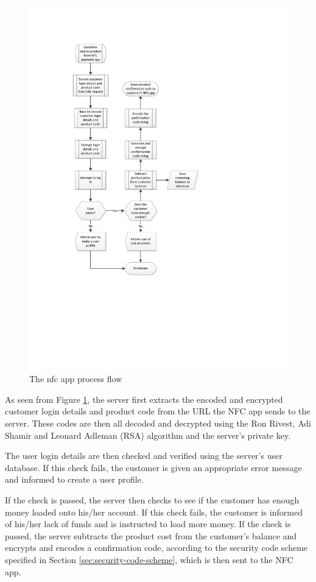 \begin{figure}
 \centering 
 \includegraphics[clip=true, trim = 0 200 100 80,
 scale=0.7]{nfc_processflow_bak}
 \caption{The nfc app process flow}
 \label{fig:nfc-process}
\end{figure}

As seen from Figure \ref{fig:nfc-process}, the server first extracts the encoded and encrypted
customer login details and product code from the URL the NFC app sends to the server. These
codes are then all decoded and decrypted using the Ron Rivest, Adi Shamir and Leonard Adleman
(RSA) algorithm and the server's private key. 

The user login details are then checked and verified using the server's user database. If this
check fails, the customer is given an appropriate error message and informed to create a user
profile. 

If the check is passed, the server then checks to see if the customer has enough money loaded
onto his/her account. If this check fails, the customer is informed of his/her lack of funds
and is instructed to load more money. If the check is passed, the server subtracts the product
cost from the customer's balance and encrypts and encodes a confirmation code, according to the
security code scheme specified in Section \ref{sec:security-code-scheme}, which is then sent
to the NFC app. 

